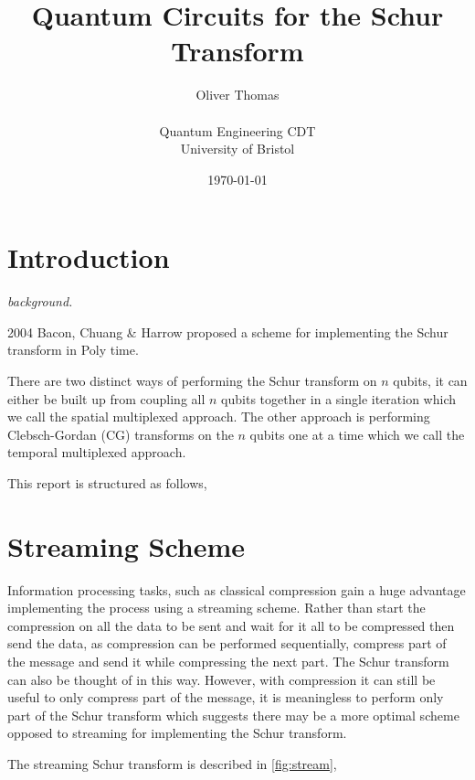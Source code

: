 \documentclass[12pt]{article}
\begin{document}

    \title{Quantum Circuits for the Schur Transform}
    \author{Oliver Thomas \\[0.5em] \\ Quantum Engineering CDT \\ University of Bristol}
    \date{\today}
    \maketitle



\section{Introduction}

\textit{background.}

2004 Bacon, Chuang \& Harrow proposed a scheme for implementing the Schur transform in Poly time. 

There are two distinct ways of performing the Schur transform on $n$ qubits, it can either be built up from coupling all $n$ qubits together in a single iteration which we call the spatial multiplexed approach. The
other approach is performing Clebsch-Gordan (CG) transforms on the $n$ qubits one at a time which we call the temporal multiplexed approach.  


This report is structured as follows,   


\section{Streaming Scheme}

Information processing tasks, such as classical compression gain a huge advantage implementing the process using a streaming scheme. Rather than start the compression on all the data to be sent and wait for it all to
be compressed then send the data, as compression can be performed sequentially, compress part of the message and send it while compressing the next part. The Schur transform can also be thought of in this way. However,
with compression it can still be useful to only compress part of the message, it is meaningless to perform only part of the Schur transform which suggests there may be a more optimal scheme opposed to streaming for 
implementing the Schur transform.      


The streaming Schur transform is described in \autoref{fig:stream},
\end{document}
